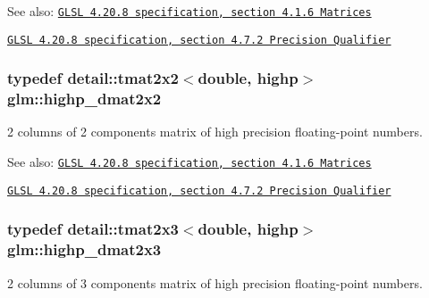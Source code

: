 \begin{Desc}
\item[See also:]\href{http://www.opengl.org/registry/doc/GLSLangSpec.4.20.8.pdf}{\tt GLSL 4.20.8 specification, section 4.1.6 Matrices} 

\href{http://www.opengl.org/registry/doc/GLSLangSpec.4.20.8.pdf}{\tt GLSL 4.20.8 specification, section 4.7.2 Precision Qualifier} \end{Desc}
\hypertarget{group__core__precision_ga5e35f6570d394c1cd34f411a473220c}{
\subsubsection[highp\_\-dmat2x2]{\setlength{\rightskip}{0pt plus 5cm}typedef detail::tmat2x2$<$double, highp$>$ {\bf glm::highp\_\-dmat2x2}}}
\label{group__core__precision_ga5e35f6570d394c1cd34f411a473220c}


2 columns of 2 components matrix of high precision floating-point numbers.

\begin{Desc}
\item[See also:]\href{http://www.opengl.org/registry/doc/GLSLangSpec.4.20.8.pdf}{\tt GLSL 4.20.8 specification, section 4.1.6 Matrices} 

\href{http://www.opengl.org/registry/doc/GLSLangSpec.4.20.8.pdf}{\tt GLSL 4.20.8 specification, section 4.7.2 Precision Qualifier} \end{Desc}
\hypertarget{group__core__precision_gfec7367665f006f2a7643103c5eddc38}{
\subsubsection[highp\_\-dmat2x3]{\setlength{\rightskip}{0pt plus 5cm}typedef detail::tmat2x3$<$double, highp$>$ {\bf glm::highp\_\-dmat2x3}}}
\label{group__core__precision_gfec7367665f006f2a7643103c5eddc38}


2 columns of 3 components matrix of high precision floating-point numbers.

